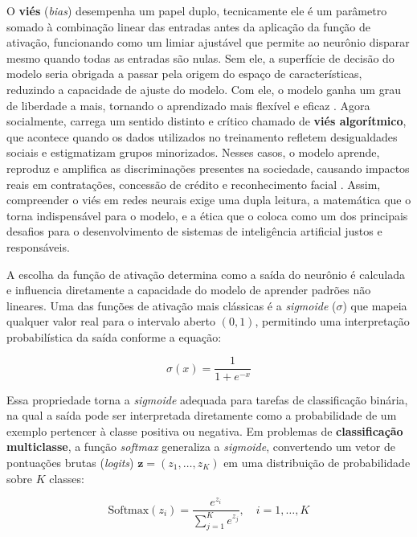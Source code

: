 O \textbf{viés} (\textit{bias}) desempenha um papel duplo, tecnicamente ele é um parâmetro somado à combinação linear das entradas antes da aplicação da função de ativação, funcionando como um limiar ajustável que permite ao neurônio disparar mesmo quando todas as entradas são nulas. Sem ele, a superfície de decisão do modelo seria obrigada a passar pela origem do espaço de características, reduzindo a capacidade de ajuste do modelo. Com ele, o modelo ganha um grau de liberdade a mais, tornando o aprendizado mais flexível e eficaz \cite{goodfellow2016}. Agora socialmente, carrega um sentido distinto e crítico chamado de \textbf{viés algorítmico}, que acontece quando os dados utilizados no treinamento refletem desigualdades sociais e estigmatizam grupos minorizados. Nesses casos, o modelo aprende, reproduz e amplifica as discriminações presentes na sociedade, causando impactos reais em contratações, concessão de crédito e reconhecimento facial \cite{barocas2023}. Assim, compreender o viés em redes neurais exige uma dupla leitura, a matemática que o torna indispensável para o modelo, e a ética que o coloca como um dos principais desafios para o desenvolvimento de sistemas de inteligência artificial justos e responsáveis.

A escolha da função de ativação determina como a saída do neurônio é calculada e influencia diretamente a capacidade do modelo de aprender padrões não lineares. Uma das funções de ativação mais clássicas é a \textit{sigmoide} ($\sigma$) que mapeia qualquer valor real para o intervalo aberto $(0, 1)$, permitindo uma interpretação probabilística da saída conforme a equação:

\begin{equation}
\sigma(x) = \frac{1}{1 + e^{-x}}
\label{eq:sigmoid}
\end{equation}

Essa propriedade torna a \textit{sigmoide} adequada para tarefas de classificação binária, na qual a saída pode ser interpretada diretamente como a probabilidade de um exemplo pertencer à classe positiva ou negativa. Em problemas de \textbf{classificação multiclasse}, a função \textit{softmax} generaliza a \textit{sigmoide}, convertendo um vetor de pontuações brutas (\textit{logits}) $\mathbf{z} = (z_1, \ldots, z_K)$ em uma distribuição de probabilidade sobre $K$ classes:

\begin{equation}
\text{Softmax}(z_i) = \frac{e^{z_i}}{\displaystyle\sum_{j=1}^{K} e^{z_j}}, \quad i = 1, \ldots, K
\label{eq:softmax}
\end{equation}

